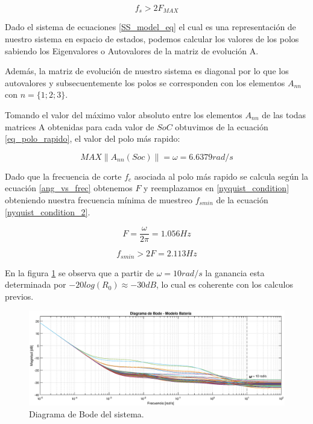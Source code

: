 \documentclass[10pt,a4paper]{article}
\begin{document}
\begin{equation}
	f_s > 2 F_{MAX}
	\label{nyquist_condition}
\end{equation}

Dado el sistema de ecuaciones \ref{SS_model_eq} el cual es una representación de
nuestro sistema en espacio de estados, podemos calcular los valores de los polos
sabiendo los Eigenvalores o Autovalores de la matriz de evolución A.

Además, la matriz de evolución de nuestro sistema es diagonal por lo que los
autovalores y subsecuentemente los polos se corresponden con los elementos
$A_{nn}$ con $n=\{1;2;3\}$.

Tomando el valor del máximo valor absoluto entre los elementos $A_{nn}$ de las
todas matrices A obtenidas para cada valor de $SoC$ obtuvimos de la ecuación
\ref{eq_polo_rapido}, el valor del polo más rapido:

     \begin{equation}
     	MAX  \left \|A_{nn}(Soc)\right \| = \omega = 6.6379 rad/s
     	\label{eq_polo_rapido}
     \end{equation}

Dado que la frecuencia de corte $f_c$ asociada al polo más rapido se calcula
según la ecuación \ref{ang_vs_frec} obtenemos $F$ y reemplazamos en
\ref{nyquist_condition} obteniendo nuestra frecuencia mínima de muestreo
$f_{smin}$ de la ecuación \ref{nyquist_condition_2}.

\begin{equation}
	F = \frac{\omega}{2 \pi} = 1.056 Hz
	\label{ang_vs_frec}
\end{equation}

\begin{equation}
	f_{s min} > 2 F = 2.113 Hz
	\label{nyquist_condition_2}
\end{equation}

En la figura \ref{system_bode} se observa que a partir de $\omega = 10 rad/s$ la
ganancia esta determinada por $-20log(R_{0})\approx-30dB$, lo cual es coherente
con los calculos previos.

\begin{figure}[h!]
	\begin{center}
		\includegraphics[width=1\textwidth]{bode_amplitud_w_grid.eps}
		\caption{Diagrama de Bode del sistema.}
		\label{system_bode}
	\end{center}
\end{figure}
\FloatBarrier
\end{document}
